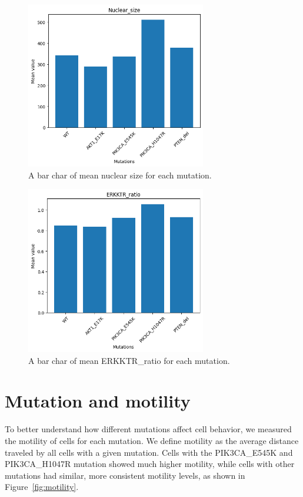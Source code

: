 \documentclass[licencjacka,en]{pracamgr}
\begin{document}
\begin{figure}[ht]
    \centering
    \includegraphics[width=0.7\textwidth]{images/size_mutations.png}
    \caption{A bar char of mean nuclear size for each mutation.}
    \label{fig:size_mutations}
\end{figure} 

\begin{figure}[ht]
    \centering
    \includegraphics[width=0.7\textwidth]{images/erk_mutations.png}
    \caption{A bar char of mean ERKKTR\_ratio for each mutation.}
    \label{fig:erk_mutations}
\end{figure} 

\section{Mutation and motility}
To better understand how different mutations affect cell behavior, we measured the motility of cells for each mutation. We define motility as the average distance traveled by all cells with a given mutation. Cells with the PIK3CA\_E545K and PIK3CA\_H1047R mutation showed much higher motility, while cells with other mutations had similar, more consistent motility levels, as shown in Figure~\ref{fig:motility}.
\end{document}
